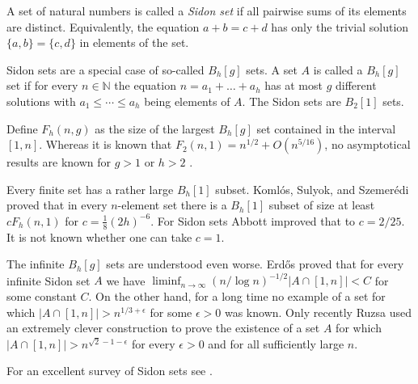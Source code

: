 \documentclass[12pt]{article}
\newcommand*{\abs}[1]{\left\lvert#1\right\rvert}
\begin{document}
A set of natural numbers is called a \emph{Sidon set} if all
pairwise sums of its elements are distinct. Equivalently, the equation
$a+b=c+d$ has only the trivial solution $\{a,b\}=\{c,d\}$ in
elements of the set.

Sidon sets are a special case of so-called $B_h[g]$ sets. A set $A$
is called a $B_h[g]$ set if for every $n\in \mathbb{N}$ the equation
$n=a_1+\dotsc+a_h$ has at most $g$ different solutions with
$a_1\leq \dotsb\leq a_h$ being elements of $A$. The Sidon sets are
$B_2[1]$ sets.

Define $F_h(n,g)$ as the size of the largest $B_h[g]$ set
contained in the interval $[1,n]$. Whereas it is known that
$F_2(n,1)=n^{1/2}+O(n^{5/16})$\cite[p.~85]{cite:halberstam_sequences},
no asymptotical results are known for $g>1$ or $h>2$
\cite{cite:green_bhg}.

Every finite set has a rather large $B_h[1]$ subset. Koml\'os,
Sulyok, and
Szemer\'edi\cite{cite:komlos_szem_sulyok_linearsubsets} proved
that in every $n$-element set there is a $B_h[1]$ subset of size at
least $cF_h(n,1)$ for $c=\tfrac{1}{8}(2h)^{-6}$. For Sidon sets
Abbott\cite{cite:abbott_sidonsubsets} improved that to $c=2/25$.
It is not known whether one can take $c=1$.

The infinite $B_h[g]$ sets are understood even worse. Erd\H{o}s
\cite[p.~89]{cite:halberstam_sequences} proved that for every
infinite Sidon set $A$ we have $\liminf_{n\to\infty}(n/\log
n)^{-1/2} \abs{A\cap [1,n]}<C$ for some constant $C$. On the other
hand, for a long time no example of a set for which $\abs{A\cap
[1,n]}>n^{1/3+\epsilon}$ for some $\epsilon>0$ was known. Only
recently Ruzsa\cite{cite:ruzsa_densesidon} used an extremely
clever construction to prove the existence of a set $A$ for which
$\abs{A\cap [1,n]}>n^{\sqrt{2}-1-\epsilon}$ for every 
$\epsilon>0$ and for all sufficiently large $n$.

For an excellent survey of Sidon sets see
\cite{cite:obryant_sidon}.
\end{document}
